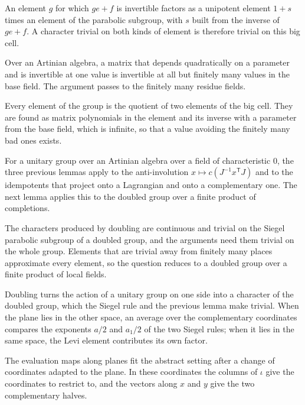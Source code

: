 An element $g$ for which $ge+f$ is invertible factors as a unipotent element
$1+s$ times an element of the parabolic subgroup, with $s$ built from the
inverse of $ge+f$. A character trivial on both kinds of element is therefore
trivial on this big cell.

Over an Artinian algebra, a matrix that depends quadratically on a parameter and
is invertible at one value is invertible at all but finitely many values in the
base field. The argument passes to the finitely many residue fields.

Every element of the group is the quotient of two elements of the big cell.
They are found as matrix polynomials in the element and its inverse with a
parameter from the base field, which is infinite, so that a value avoiding the
finitely many bad ones exists.

For a unitary group over an Artinian algebra over a field of characteristic
$0$, the three previous lemmas apply to the anti-involution
$x\mapsto c(J^{-1}x^{\mathsf T}J)$ and to the idempotents that project onto a
Lagrangian and onto a complementary one. The next lemma applies this to the
doubled group over a finite product of completions.

The characters produced by doubling are continuous and trivial on the Siegel
parabolic subgroup of a doubled group, and the arguments need them trivial on
the whole group. Elements that are trivial away from finitely many places
approximate every element, so the question reduces to a doubled group over a
finite product of local fields.

Doubling turns the action of a unitary group on one side into a character of
the doubled group, which the Siegel rule and the previous lemma make trivial.
When the plane lies in the other space, an average over the complementary
coordinates compares the exponents $a/2$ and $a_1/2$ of the two Siegel rules;
when it lies in the same space, the Levi element contributes its own factor.

The evaluation maps along planes fit the abstract setting after a change of
coordinates adapted to the plane. In these coordinates the columns of $\iota$
give the coordinates to restrict to, and the vectors along $x$ and $y$ give the
two complementary halves.

